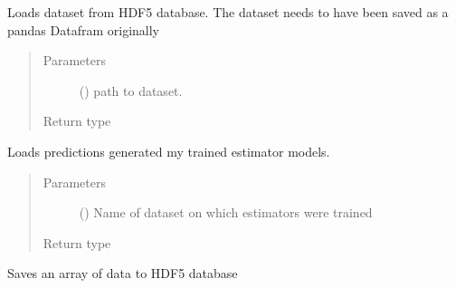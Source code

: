 \documentclass[letterpaper,10pt,english]{sphinxmanual}
\begin{document}
\begin{fulllineitems}
\begin{fulllineitems}
\label{\detokenize{shared:mleap.shared.files_io.FilesIO.load_dataset_pd}}
Loads dataset from HDF5 database. 
The dataset needs to have been saved as a pandas Datafram originally
\begin{quote}\begin{description}
\item[{Parameters}] \leavevmode
{} () \textendash{} path to dataset.

\item[{Return type}] \leavevmode
{}

\end{description}\end{quote}

\end{fulllineitems}


\begin{fulllineitems}
\label{\detokenize{shared:mleap.shared.files_io.FilesIO.load_predictions_for_dataset}}
Loads predictions generated my trained estimator models.
\begin{quote}\begin{description}
\item[{Parameters}] \leavevmode
{} () \textendash{} Name of dataset on which estimators were trained

\item[{Return type}] \leavevmode
{}

\end{description}\end{quote}

\end{fulllineitems}


\begin{fulllineitems}
\label{\detokenize{shared:mleap.shared.files_io.FilesIO.save_array_hdf5}}
Saves an array of data to HDF5 database


\end{fulllineitems}
\end{fulllineitems}
\end{document}
